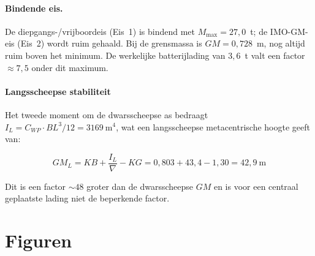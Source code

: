 \paragraph{Bindende eis.}
De diepgangs-/vrijboordeis (Eis~1) is bindend met
$M_\mathrm{max} = 27{,}0$~t; de IMO-GM-eis (Eis~2) wordt ruim gehaald. Bij de
grensmassa is $GM = 0{,}728$~m, nog altijd ruim boven het minimum. De
werkelijke batterijlading van $3{,}6$~t valt een factor $\approx 7{,}5$ onder
dit maximum.

\paragraph{Langsscheepse stabiliteit}
Het tweede moment om de dwarsscheepse as bedraagt
$I_L = C_{WP} \cdot BL^3/12 = 3169\ \mathrm{m^4}$, wat een langsscheepse
metacentrische hoogte geeft van:

\begin{equation}
    GM_L = KB + \frac{I_L}{\nabla} - KG
         = 0{,}803 + 43{,}4 - 1{,}30
         = 42{,}9\ \mathrm{m}
\end{equation}

Dit is een factor $\sim 48$ groter dan de dwarsscheepse $GM$ en is voor een
centraal geplaatste lading niet de beperkende factor.

\section{Figuren}
\label{sec:stab_figuren}

